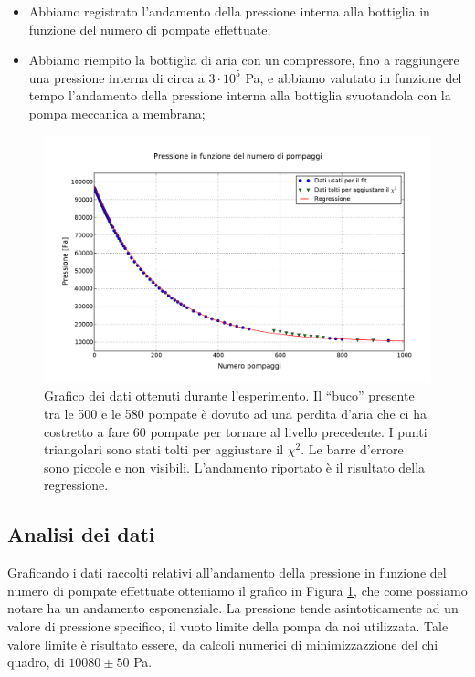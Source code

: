 \begin{itemize}
	\item{Abbiamo registrato l'andamento della pressione interna alla bottiglia in funzione del numero di pompate effettuate;}
	\item{Abbiamo riempito la bottiglia di aria con un compressore, fino a raggiungere una pressione
	interna di circa a $3 \cdot 10^5$ \si{\Pa}, e abbiamo valutato in funzione del tempo l'andamento della pressione interna alla bottiglia svuotandola con la pompa meccanica a membrana;}
\end{itemize}

\begin{figure}[h!]
    \includegraphics[width=140mm]{graph.pdf}
    \caption{Grafico dei dati ottenuti durante l'esperimento. Il ``buco'' presente tra le 500 e le 580 pompate è dovuto ad una perdita d'aria
    che ci ha costretto a fare 60 pompate per tornare al livello precedente. I punti triangolari sono stati tolti per aggiustare il $\chi^2$.
    Le barre d'errore sono piccole e non visibili. L'andamento riportato è il risultato della regressione.}
    \label{fig:graph1}
\end{figure}

\subsection{Analisi dei dati}

Graficando i dati raccolti relativi all'andamento della pressione in funzione del numero di pompate effettuate otteniamo
il grafico in Figura \ref{fig:graph1}, che come possiamo notare ha un andamento esponenziale. La pressione tende asintoticamente ad un valore di pressione specifico, il vuoto limite della pompa
da noi utilizzata. Tale valore limite è risultato essere, da calcoli numerici di minimizzazzione del chi quadro, di $10080 \pm 50$ \si{\Pa}.


